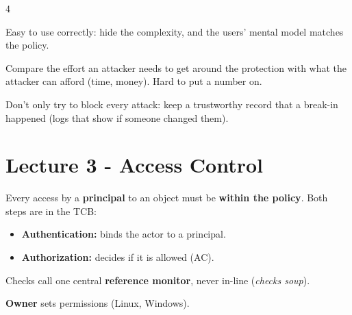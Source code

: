 \documentclass[8pt,a4paper,landscape]{extarticle}
\begin{document}
\begin{multicols*}{4}
\begin{defn}[title={8 - Psychological acceptability}]
    Easy to use correctly: hide the complexity, and the users' mental model matches the policy.
\end{defn}

\begin{warn}[title={9 - Work factor}]
    Compare the effort an attacker needs to get around the protection with what the attacker can afford (time, money). Hard to put a number on.
\end{warn}

\begin{warn}[title={10 - Compromise recording}]
    Don't only try to block every attack: keep a trustworthy record that a break-in happened (logs that show if someone changed them).
\end{warn}

\section{Lecture 3 - Access Control}

\begin{defn}[title=Access control (AC)]
    Every access by a \textbf{principal} to an object must be \textbf{within the policy}. Both steps are in the TCB:
    \begin{itemize}
        \item \textbf{Authentication:} binds the actor to a principal.
        \item \textbf{Authorization:} decides if it is allowed (AC).
    \end{itemize}
    Checks call one central \textbf{reference monitor}, never in-line (\textit{checks soup}).
\end{defn}

\begin{thm}[title=Discretionary AC (DAC)]
    \textbf{Owner} sets permissions (Linux, Windows).
\end{thm}


\end{multicols*}
\end{document}
